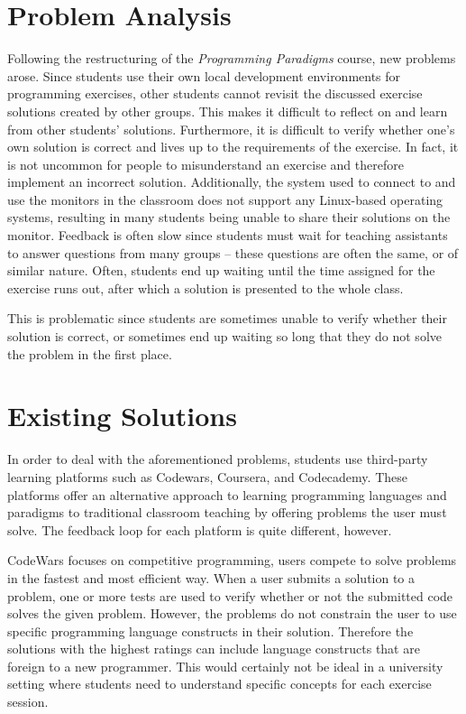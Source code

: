 \section{Problem Analysis}
Following the restructuring of the \textit{Programming Paradigms} course, new problems arose.
Since students use their own local development environments for programming exercises, other students cannot revisit the discussed exercise solutions created by other groups.
This makes it difficult to reflect on and learn from other students' solutions.
Furthermore, it is difficult to verify whether one's own solution is correct and lives up to the requirements of the exercise.
In fact, it is not uncommon for people to misunderstand an exercise and therefore implement an incorrect solution.
Additionally, the system used to connect to and use the monitors in the classroom does not support any Linux-based operating systems, resulting in many students being unable to share their solutions on the monitor.
Feedback is often slow since students must wait for teaching assistants to answer questions from many groups -- these questions are often the same, or of similar nature.
Often, students end up waiting until the time assigned for the exercise runs out, after which a solution is presented to the whole class.

This is problematic since students are sometimes unable to verify whether their solution is correct, or sometimes end up waiting so long that they do not solve the problem in the first place.

\section{Existing Solutions}
In order to deal with the aforementioned problems, students use third-party learning platforms such as Codewars\cite{Codewars}, Coursera\cite{Coursera}, and Codecademy\cite{Codecademy}.
These platforms offer an alternative approach to learning programming languages and paradigms to traditional classroom teaching by offering problems the user must solve.
The feedback loop for each platform is quite different, however.


CodeWars focuses on competitive programming, users compete to solve problems in the fastest and most efficient way.
When a user submits a solution to a problem, one or more tests are used to verify whether or not the submitted code solves the given problem.
However, the problems do not constrain the user to use specific programming language constructs in their solution.
Therefore the solutions with the highest ratings can include language constructs that are foreign to a new programmer.
This would certainly not be ideal in a university setting where students need to understand specific concepts for each exercise session.


